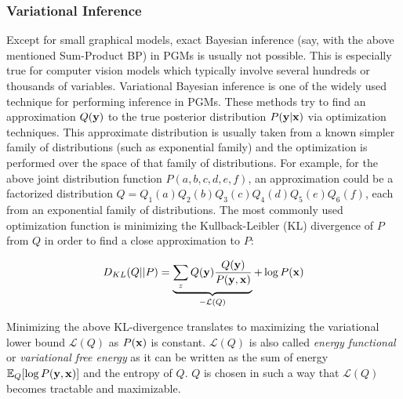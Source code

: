 \subsubsection{Variational Inference}
Except for small graphical models, exact Bayesian inference (say, with
the above mentioned Sum-Product BP) in PGMs is
usually not possible. This is especially true for computer vision models which
typically involve several hundreds or thousands of variables.
Variational Bayesian inference is one of the widely used technique for performing
inference in PGMs. These methods try to find an
approximation $Q(\mathbf{y})$ to the true posterior distribution $P(\mathbf{y}|\mathbf{x})$
via optimization techniques.
This approximate distribution is usually taken from a known simpler family
of distributions (such as exponential family) and the optimization is
performed over the space of that family of distributions. For example, for the
above joint distribution function $P(a,b,c,d,e,f)$,
an approximation could be a factorized distribution
$Q = Q_1(a) Q_2(b) Q_3(c) Q_4(d) Q_5(e) Q_6(f)$, each from an exponential family of distributions.
The most commonly used optimization function is minimizing the
Kullback-Leibler (KL) divergence of $P$ from $Q$ in order to find a close approximation
to $P$:

\begin{equation}
D_{KL}(Q||P) = \underbrace{\sum_z Q(\target) \frac{Q(\target)}{P(\target,\obs)}}_{-\mathcal{L}(Q)} +
\log P(\obs)
\label{eqn:kl}
\vspace{-0.2cm}
\end{equation}

Minimizing the above KL-divergence translates to maximizing the variational
lower bound $\mathcal{L}(Q)$ as $P(\mathbf{x})$ is constant.
$\mathcal{L}(Q)$ is also called \textit{energy functional} or
\textit{variational free energy} as it can be written as the sum of energy
$\mathbb{E}_Q[\log P(\mathbf{y},\mathbf{x})]$ and the entropy of $Q$. $Q$ is chosen
in such a way that $\mathcal{L}(Q)$ becomes tractable and maximizable.

